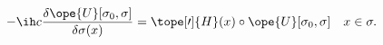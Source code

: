 \begin{equation}	\label{12.29}
-\ih c \frac{\delta\ope{U}[\sigma_0,\sigma]}{\delta\sigma(x)}
=
\tope[\prime]{H}(x)\circ \ope{U}[\sigma_0,\sigma]
\quad
x\in\sigma .
	\end{equation}

